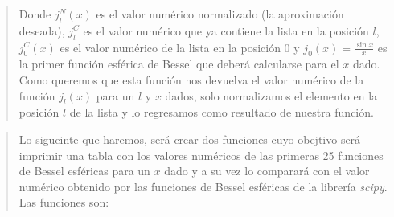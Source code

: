 \documentclass[9pt]{article}
\begin{document}
\begin{quote}
Donde \(j_l^N (x)\) es el valor numérico normalizado (la aproximación
deseada), \(j_l^C\) es el valor numérico que ya contiene la lista en la
posición \(l\), \(j_0^C(x)\) es el valor numérico de la lista en la
posición 0 y \(j_0(x)=\frac{\sin x }{x}\) es la primer función esférica
de Bessel que deberá calcularse para el \(x\) dado. Como queremos que
esta función nos devuelva el valor numérico de la función \(j_l(x)\)
para un \(l\) y \(x\) dados, solo normalizamos el elemento en la
posición \(l\) de la lista y lo regresamos como resultado de nuestra
función.
\end{quote}

    \begin{quote}
Lo sigueinte que haremos, será crear dos funciones cuyo obejtivo será
imprimir una tabla con los valores numéricos de las primeras 25
funciones de Bessel esféricas para un \(x\) dado y a su vez lo comparará
con el valor numérico obtenido por las funciones de Bessel esféricas de
la librería \emph{scipy}. Las funciones son:
\end{quote}
\end{document}
